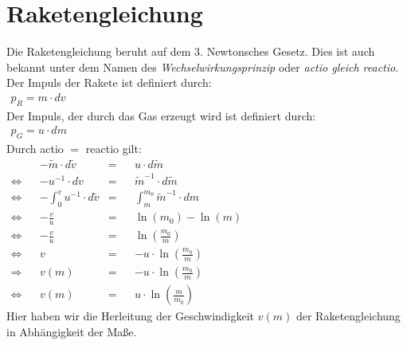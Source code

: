 \documentclass[a4paper,12pt]{article}
\begin{document}
	
\section*{Raketengleichung} %

Die Raketengleichung beruht auf dem 3. Newtonsches Gesetz. Dies ist auch bekannt unter dem Namen des \textit{Wechselwirkungsprinzip} oder \textit{actio gleich reactio}.\\
Der Impuls der Rakete ist definiert durch:\\

$\begin{aligned}
	p_R = m\cdot dv
\end{aligned}$\\

Der Impuls, der durch das Gas erzeugt wird ist definiert durch:\\

$\begin{aligned}
	p_G = u\cdot dm
\end{aligned}$\\

Durch actio $=$ reactio gilt:\\

$\begin{aligned}
	                &&-\tilde{m}\cdot d\tilde{v}           &=&& u \cdot d\tilde{m}\\
	\Leftrightarrow &&-u^{-1}\cdot dv                      &=&& \tilde{m}^{-1} \cdot d\tilde{m}\\
	\Leftrightarrow &&-\int_{0}^{v} u^{-1}\cdot d\tilde{v} &=&& \int_{m}^{m_0} \tilde{m}^{-1} \cdot dm\\
	\Leftrightarrow && -\frac{v}{u}                        &=&& \ln(m_0) - \ln(m)\\
	\Leftrightarrow && -\frac{v}{u}                        &=&& \ln\left(\frac{m_0}{m}\right)\\
	\Leftrightarrow && v                                   &=&& -u\cdot \ln\left(\frac{m_0}{m}\right)\\
	\Rightarrow     && v(m)                                &=&& -u\cdot \ln\left(\frac{m_0}{m}\right)\\
	\Leftrightarrow && v(m)                                &=&& u\cdot \ln\left(\frac{m}{m_0}\right)
\end{aligned}$\\

Hier haben wir die Herleitung der Geschwindigkeit $v(m)$ der Raketengleichung in Abhängigkeit der Maße.\\
\end{document}

